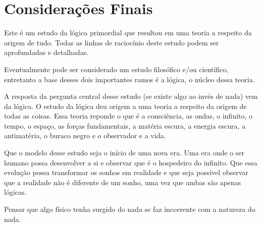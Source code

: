 \section*{Considerações Finais}
Este é um estudo da lógica primordial que resultou em uma teoria a respeito da origem de tudo. Todas as linhas de raciocínio deste estudo podem ser aprofundadas e detalhadas. 

Eventualmente pode ser considerado um estudo filosófico e/ou científico, entretanto a base desses dois importantes ramos é a lógica, o núcleo dessa teoria. 

A resposta da pergunta central desse estudo (se existe algo ao invés de nada) vem da lógica. O estudo da lógica deu origem a uma teoria a respeito da origem de todas as coisas. Essa teoria reponde o que é a consciência, as ondas, o infinito, o tempo, o espaço, as forças fundamentais, a matéria escura, a energia escura, a antimatéria, o buraco negro e o observador e a vida.

Que o modelo desse estudo seja o início de uma nova era. Uma era onde o ser humano possa desenvolver a si e observar que é o hospedeiro do infinito. Que essa evolução possa transformar os sonhos em realidade e que seja possível observar que a realidade não é diferente de um sonho, uma vez que ambas são apenas lógicas.

Pensar que algo físico tenha surgido do nada se faz incoerente com a natureza do nada.